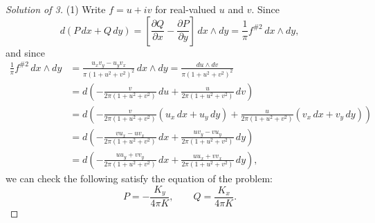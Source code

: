 \documentclass[a4paper]{article}
\theoremstyle{definition}
\begin{document}
\newpage
\begin{proof}[Solution of 3]
(1)
Write $f=u+iv$ for real-valued $u$ and $v$.
Since
\[d\left(P\,dx+Q\,dy\right)=\left[\frac{\partial Q}{\partial x}-\frac{\partial P}{\partial y}\right]\,dx\wedge dy=\frac1\pi f^{\#2}\,dx\wedge dy,\]
and since
\begin{align*}
\frac1\pi f^{\#2}\,dx\wedge dy&=\frac{u_xv_y-u_yv_x}{\pi(1+u^2+v^2)^2}\,dx\wedge dy=\frac{du\wedge dv}{\pi(1+u^2+v^2)^2}\\
&=d\left(-\frac v{2\pi(1+u^2+v^2)}\,du+\frac u{2\pi(1+u^2+v^2)}\,dv\right)\\
&=d\left(-\frac v{2\pi(1+u^2+v^2)}(u_x\,dx+u_y\,dy)+\frac u{2\pi(1+u^2+v^2)}(v_x\,dx+v_y\,dy)\right)\\
&=d\left(-\frac{vu_x-uv_x}{2\pi(1+u^2+v^2)}\,dx+\frac{uv_y-vu_y}{2\pi(1+u^2+v^2)}\,dy\right)\\
&=d\left(-\frac{uu_y+vv_y}{2\pi(1+u^2+v^2)}\,dx+\frac{uu_x+vv_x}{2\pi(1+u^2+v^2)}\,dy\right),
\end{align*}
we can check the following satisfy the equation of the problem:
\[P=-\frac{K_y}{4\pi K},\qquad Q=\frac{K_x}{4\pi K}.\]



\end{proof}
\end{document}
